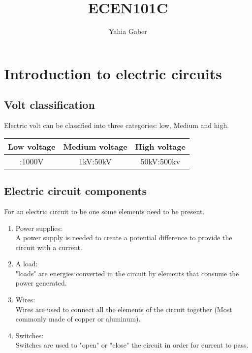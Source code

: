 \documentclass[a4paper]{book}
\author{Yahia Gaber}
\title{ECEN101C}
\begin{document}
\maketitle
\tableofcontents

\chapter{Introduction to electric circuits}

\section{Volt classification}

Electric volt can be classified into three categories: low, Medium and high.

\begin{center}

  \begin{tabular}{| c | c | c |}

    \hline
    Low voltage & Medium voltage & High voltage \\
    \hline
    :1000V & 1kV:50kV & 50kV:500kv \\
    \hline

  \end{tabular}

\end{center}

\section{Electric circuit components}

For an electric circuit to be one some elements need to be present.

\begin{enumerate}

  \item Power supplies:\\
    A power supply is needed to create a potential difference to provide the circuit with a current.

  \item A load:\\
    "loads" are energies converted in the circuit by elements that consume the power generated.

  \item Wires:\\
    Wires are used to connect all the elements of the circuit together (Most commonly made of copper or aluminum).

  \item Switches:\\
    Switches are used to "open" or "close" the circuit in order for current to pass.

\end{enumerate}
\end{document}
